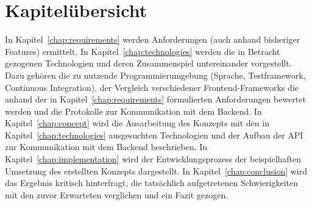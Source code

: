 \section{Kapitelübersicht}
In Kapitel~\ref{chap:requirements} werden Anforderungen (auch anhand bisheriger Features) ermittelt.
In Kapitel~\ref{chap:technologies} werden die in Betracht gezogenen Technologien und deren Zusammenspiel untereinander vorgestellt. Dazu gehören die zu nutzende Programmierumgebung (Sprache, Testframework, Continuous Integration), der Vergleich verschiedener Frontend-Frameworks die anhand der in Kapitel~\ref{chap:requirements} formulierten Anforderungen bewertet werden und die Protokolle zur Kommunikation mit dem Backend.
In Kapitel~\ref{chap:concept} wird die Ausarbeitung des Konzepts mit den in Kapitel~\ref{chap:technologies} ausgesuchten Technologien und der Aufbau der API zur Kommunikation mit dem Backend beschrieben.
In Kapitel~\ref{chap:implementation} wird der Entwicklungsprozess der beispielhaften Umsetzung des erstellten Konzepts dargestellt.
In Kapitel~\ref{chap:conclusion} wird das Ergebnis kritisch hinterfragt, die tatsächlich aufgetretenen Schwierigkeiten mit den zuvor Erwarteten verglichen und ein Fazit gezogen.
